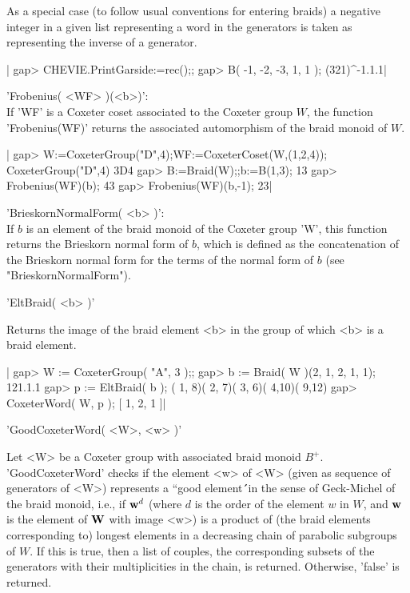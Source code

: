 As  a  special  case  (to  follow  usual conventions for entering braids) a
negative  integer in a given list representing  a word in the generators is
taken as representing the inverse of a generator.

|    gap> CHEVIE.PrintGarside:=rec();;
    gap> B( -1, -2, -3, 1, 1 );
    (321)^-1.1.1|


'Frobenius(  <WF> )(<b>)':\\ If  'WF' is a  Coxeter coset associated to the
Coxeter  group  $W$,  the  function  'Frobenius(WF)' returns the associated
automorphism of the braid monoid of $W$.

|    gap> W:=CoxeterGroup("D",4);WF:=CoxeterCoset(W,(1,2,4));
    CoxeterGroup("D",4)
    3D4
    gap> B:=Braid(W);;b:=B(1,3);
    13
    gap> Frobenius(WF)(b);
    43
    gap> Frobenius(WF)(b,-1);
    23|

'BrieskornNormalForm( <b> )':\\ If $b$ is an element of the braid monoid of
the  Coxeter group 'W', this function  returns the Brieskorn normal form of
$b$, which is defined as the concatenation of the Brieskorn normal form for
the terms of the normal form of $b$ (see "BrieskornNormalForm").


'EltBraid( <b> )'

Returns  the image of the braid element <b>  in the group of which <b> is a
braid element.

|    gap>  W := CoxeterGroup( "A", 3 );;
    gap>  b := Braid( W )(2, 1, 2, 1, 1);
    121.1.1
    gap> p := EltBraid( b );
    ( 1, 8)( 2, 7)( 3, 6)( 4,10)( 9,12)
    gap> CoxeterWord( W, p );
    [ 1, 2, 1 ]|


'GoodCoxeterWord( <W>, <w> )'

Let   <W>  be  a   Coxeter  group  with   associated  braid  monoid  $B^+$.
'GoodCoxeterWord'  checks if the  element <w> of  <W> (given as sequence of
generators  of  <W>)  represents  a  ``good  element\'\'\  in  the sense of
Geck-Michel \cite{GM97} of the braid monoid, i.e., if ${\bf w}^d$ (where $d$ is
the order of the element $w$ in $W$, and ${\bf w}$ is the element of ${\bf W}$ with
image  <w>) is a  product of (the  braid elements corresponding to) longest
elements  in a decreasing chain  of parabolic subgroups of  $W$. If this is
true,  then a list of couples,  the corresponding subsets of the generators
with  their multiplicities in the chain, is returned. Otherwise, 'false' is
returned.

